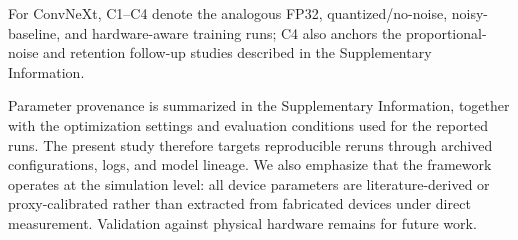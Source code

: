 For ConvNeXt, C1--C4 denote the analogous FP32, quantized/no-noise, noisy-baseline, and hardware-aware training runs; C4 also anchors the proportional-noise and retention follow-up studies described in the Supplementary Information.

Parameter provenance is summarized in the Supplementary Information, together with the optimization settings and evaluation conditions used for the reported runs. The present study therefore targets reproducible reruns through archived configurations, logs, and model lineage. We also emphasize that the framework operates at the simulation level: all device parameters are literature-derived or proxy-calibrated rather than extracted from fabricated devices under direct measurement. Validation against physical hardware remains for future work.

